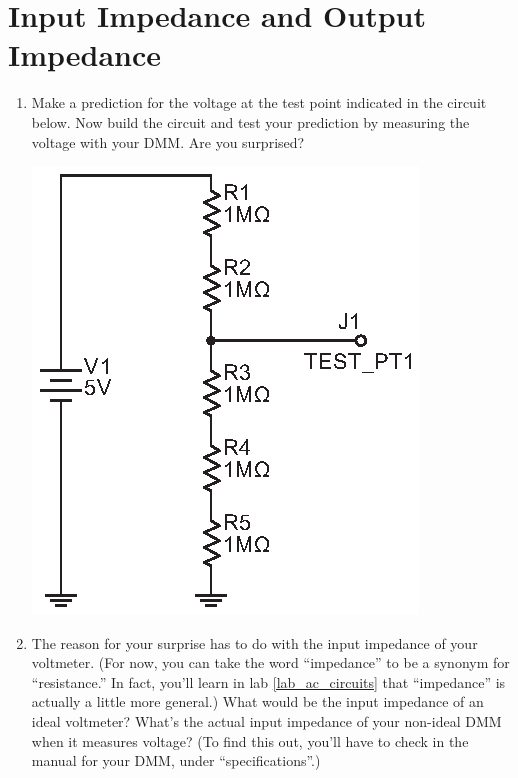 \section{Input Impedance and Output Impedance}
\label{lab_input_output_impedance}


\bigskip

\begin{enumerate}[wide]

\item Make a prediction for the voltage at the test point indicated in the circuit below.  Now build the circuit and test your prediction by measuring the voltage with your DMM.  Are you surprised?   \label{part_voltage_surprise}

\begin{center}
\includegraphics{input_output_impedance/input_impedance1.eps}
\end{center}

\item The reason for your surprise has to do with the input impedance of your voltmeter.  (For now, you can take the word ``impedance'' to be a synonym for ``resistance.''  In fact, you'll learn in lab \ref{lab_ac_circuits} that ``impedance'' is actually a little more general.)  What would be the input impedance of an ideal voltmeter?  What's the actual input impedance of your non-ideal DMM when it measures voltage?  (To find this out, you'll have to check in the manual for your DMM, under ``specifications''.) \label{part_dmm_impedance}


\end{enumerate}
